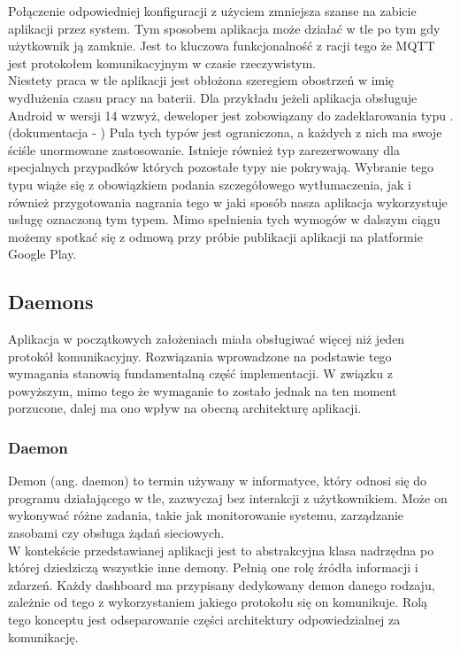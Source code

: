 Połączenie odpowiedniej konfiguracji z użyciem  zmniejsza szanse na zabicie aplikacji przez system. Tym sposobem aplikacja może działać w tle po tym gdy użytkownik ją zamknie. Jest to kluczowa funkcjonalność z racji tego że MQTT jest protokołem komunikacyjnym w czasie rzeczywistym.\\

Niestety praca w tle aplikacji jest obłożona szeregiem obostrzeń w imię wydłużenia czasu pracy na baterii. Dla przykładu jeżeli aplikacja obsługuje Android w wersji 14 wzwyż, deweloper jest zobowiązany do zadeklarowania typu . (dokumentacja - \cite{fgstyperequired}) Pula tych typów jest ograniczona, a każdych z nich ma swoje ściśle unormowane zastosowanie. Istnieje również typ zarezerwowany dla specjalnych przypadków których pozostałe typy nie pokrywają. Wybranie tego typu wiąże się z obowiązkiem podania szczegółowego wytłumaczenia, jak i również przygotowania nagrania tego w jaki sposób nasza aplikacja wykorzystuje usługę oznaczoną tym typem. Mimo spełnienia tych wymogów w dalszym ciągu możemy spotkać się z odmową przy próbie publikacji aplikacji na platformie Google Play.

\subsection{Daemons}
Aplikacja w początkowych założeniach miała obsługiwać więcej niż jeden protokół komunikacyjny. Rozwiązania wprowadzone na podstawie tego wymagania stanowią fundamentalną część implementacji. W związku z powyższym, mimo tego że wymaganie to zostało jednak na ten moment porzucone, dalej ma ono wpływ na obecną architekturę aplikacji.

\subsubsection{Daemon}
Demon (ang. daemon) to termin używany w informatyce, który odnosi się do programu działającego w tle, zazwyczaj bez interakcji z użytkownikiem. Może on wykonywać różne zadania, takie jak monitorowanie systemu, zarządzanie zasobami czy obsługa żądań sieciowych.\\

W kontekście przedstawianej aplikacji jest to abstrakcyjna klasa nadrzędna po której dziedziczą wszystkie inne demony. Pełnią one rolę źródła informacji i zdarzeń. Każdy dashboard ma przypisany dedykowany demon danego rodzaju, zależnie od tego z wykorzystaniem jakiego protokołu się on komunikuje. Rolą tego konceptu jest odseparowanie części architektury odpowiedzialnej za komunikację.\\

